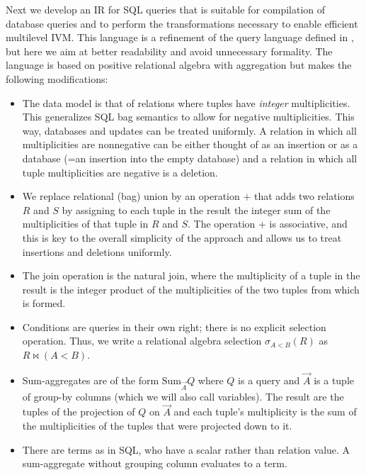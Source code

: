 \def\Sum{\mbox{Sum}}


Next we develop an IR for SQL queries that is suitable for compilation of database queries and to perform the transformations necessary to enable efficient multilevel IVM. This language is a refinement of the query language defined in \cite{koch-pods:10}, but here we aim at better readability and avoid unnecessary formality. The language is based on positive relational algebra with aggregation but makes the following modifications:
%
\begin{itemize}
\addtolength{\topsep}{-0.3ex}
\addtolength{\labelsep}{-0.3ex}
\addtolength{\itemsep}{-1ex}
\item
The data model is that of relations where tuples have {\em integer} multiplicities. This generalizes SQL bag semantics to allow for
negative multiplicities. This way, databases and updates can be treated uniformly. A relation in which all multiplicities are
nonnegative can be either thought of as an insertion or as a database (=an insertion into the empty database) and a relation in which all tuple multiplicities are negative is a deletion.

\item
We replace relational (bag) union by an operation $+$ that adds two relations $R$ and $S$ by assigning to each tuple in the result the integer sum of the multiplicities of that tuple in $R$ and $S$. The operation $+$ is associative, and this is key to the overall simplicity of the
approach and allows us to treat insertions and deletions uniformly.

\item
The join operation is the natural join, where the multiplicity of a tuple in the result
is the integer product of the multiplicities of the two tuples from which is formed.

\item
Conditions are queries in their own right; there is no explicit selection operation. Thus, we write a relational algebra selection
$\sigma_{A<B}(R)$ as $R \bowtie (A<B)$.

\item
Sum-aggregates are of the form $\Sum_{\vec{A}} Q$ where $Q$ is a query and $\vec{A}$ is a tuple of group-by columns (which we will also
call variables). The result are the tuples of the projection of $Q$ on $\vec{A}$ and each tuple's multiplicity is the sum of the
multiplicities of the tuples that were projected down to it.

\item
There are terms as in SQL, who have a scalar rather than relation value. A sum-aggregate without grouping column evaluates to a term.


\end{itemize}
